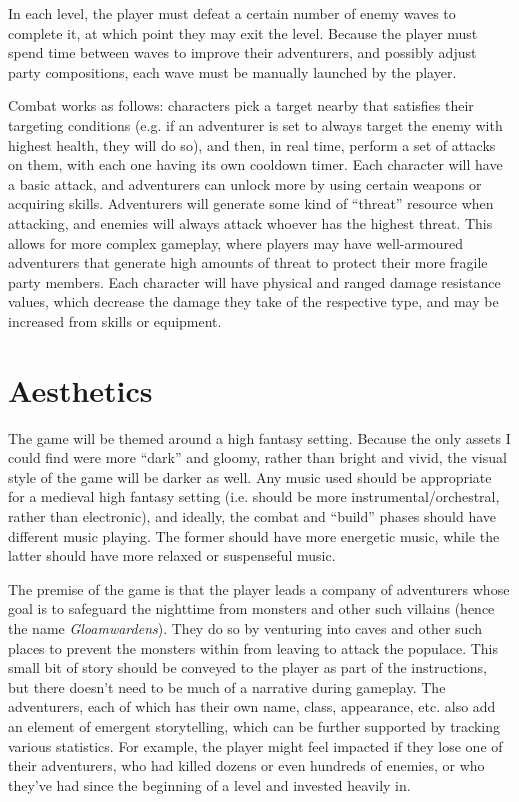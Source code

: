 \documentclass[10pt]{article}
\begin{document}
In each level, the player must defeat a certain number of enemy waves to complete it, at which point they may exit the level.
Because the player must spend time between waves to improve their adventurers, and possibly adjust party compositions, each wave
must be manually launched by the player.

Combat works as follows: characters pick a target nearby that satisfies their targeting conditions (e.g. if an adventurer is set to always target
the enemy with highest health, they will do so), and then, in real time, perform a set of attacks on them, with each one having its own cooldown timer.
Each character will have a basic attack, and adventurers can unlock more by using certain weapons or acquiring skills. Adventurers will generate
some kind of ``threat'' resource when attacking, and enemies will always attack whoever has the highest threat. This allows for more complex gameplay,
where players may have well-armoured adventurers that generate high amounts of threat to protect their more fragile party members. Each character
will have physical and ranged damage resistance values, which decrease the damage they take of the respective type, and may be increased
from skills or equipment.

\section{Aesthetics}

The game will be themed around a high fantasy setting. Because the only assets I could find were more ``dark'' and gloomy, rather than bright
and vivid, the visual style of the game will be darker as well. Any music used should be appropriate for a medieval high fantasy setting
(i.e. should be more instrumental/orchestral, rather than electronic), and ideally, the combat and ``build'' phases should have different music playing.
The former should have more energetic music, while the latter should have more relaxed or suspenseful music.

The premise of the game is that the player leads a company of adventurers whose goal is to safeguard the nighttime from monsters and other such villains
(hence the name \textit{Gloamwardens}). They do so by venturing into caves and other such places to prevent the monsters within from leaving
to attack the populace. This small bit of story should be conveyed to the player as part of the instructions, but there doesn't need to be
much of a narrative during gameplay. The adventurers, each of which has their own name, class, appearance, etc. also add an element of emergent
storytelling, which can be further supported by tracking various statistics. For example, the player might feel impacted if they lose one
of their adventurers, who had killed dozens or even hundreds of enemies, or who they've had since the beginning of a level and invested heavily in.
\end{document}
